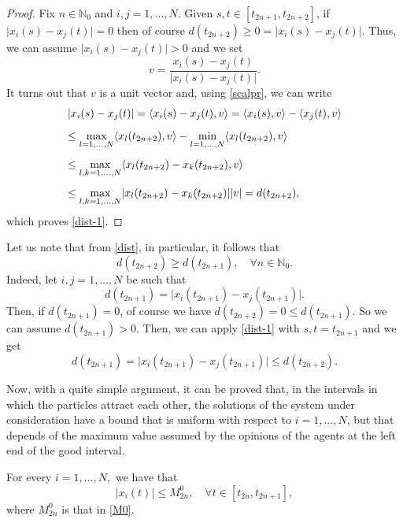 \documentclass[a4paper,11pt,oneside]{article}
\begin{document}
	\begin{proof}
		Fix $n\in\mathbb{N}_{0}$ and $i,j=1,\dots,N$. Given $s,t\in [t_{2n+1},t_{2n+2}]$, if $\lvert x_{i}(s)-x_{j}(t)\rvert=0$ then of course $d(t_{2n+2})\geq 0=\lvert x_{i}(s)-x_{j}(t)\rvert$. Thus, we can assume $\lvert x_{i}(s)-x_{j}(t)\rvert>0$ and we set $$v=\frac{x_{i}(s)-x_{j}(t)}{\lvert x_{i}(s)-x_{j}(t)\rvert}.$$
		It turns out that $v$ is a unit vector and, using \eqref{scalpr}, we can write 
		$$\begin{array}{l}
			\vspace{0.3cm}\displaystyle{\lvert x_{i}(s)-x_{j}(t)\rvert=\langle x_{i}(s)-x_{j}(t),v\rangle=\langle x_{i}(s),v\rangle-\langle x_{j}(t),v\rangle}\\
			\vspace{0.3cm}\displaystyle{\leq \max_{l=1,\dots,N}\langle x_{l}(t_{2n+2}),v\rangle-\min_{l=1,\dots,N}\langle x_{l}(t_{2n+2}),v\rangle}\\
			\vspace{0.3cm}\displaystyle{\leq \max_{l,k=1,\dots,N}\langle x_{l}(t_{2n+2})-x_{k}(t_{2n+2}),v\rangle}	\\
			\displaystyle{\leq \max_{l,k=1,\dots,N}\lvert x_{l}(t_{2n+2})-x_{k}(t_{2n+2})\rvert\lvert v\rvert=d(t_{2n+2}),}
		\end{array}$$
		which proves \eqref{dist-1}.
	\end{proof}
	\begin{oss}
		Let us note that from \eqref{dist}, in particular, it follows that
		\begin{equation}\label{cre}
			d(t_{2n+2})\geq d(t_{2n+1}),\quad \forall n\in \mathbb{N}_{0}.
		\end{equation}
		Indeed, let $i,j=1,\dots,N$ be such that $$d(t_{2n+1})=\lvert x_{i}(t_{2n+1})-x_{j}(t_{2n+1})\rvert.$$
		Then, if $d(t_{2n+1})=0$, of course we have $d(t_{2n+2})=0\leq d(t_{2n+1})$. So we can assume $d(t_{2n+1})>0$.
		Then, we can apply \eqref{dist-1} with $s,t=t_{2n+1}$ and we get $$d(t_{2n+1})=\lvert x_{i}(t_{2n+1})-x_{j}(t_{2n+1})\rvert\leq d(t_{2n+2}).$$
	\end{oss}
Now, with a quite simple argument, it can be proved that, in the intervals in which the particles attract each other, the solutions of the system under consideration have a bound that is uniform with respect to $i=1,\dots,N$, but that depends of the maximum value assumed by the opinions of the agents at the left end of the good interval. \begin{lem}\label{L3}
		For every $i=1,\dots,N,$ we have that \begin{equation}\label{boundsol}
			\lvert x_{i}(t)\rvert\leq M_{2n}^{0},\quad \forall t\in [t_{2n},t_{2n+1}],
		\end{equation}
		where $M_{2n}^{0}$ is that in \eqref{M0}.	
	\end{lem}
\end{document}
